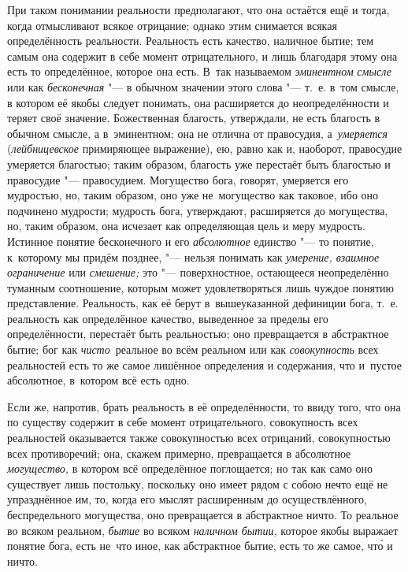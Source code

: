 \label{bkm:bm73b}При таком понимании реальности предполагают, что она
остаётся ещё и тогда, когда отмысливают всякое отрицание; однако этим снимается
всякая определённость реальности. Реальность есть качество, наличное бытие; тем
самым она содержит в себе момент отрицательного, и лишь благодаря этому она
есть то определённое, которое она есть. В~так называемом
{\em эминентном} {\em смысле} или как {\em бесконечная} "--- в обычном значении
этого слова "--- т.~е. в~том смысле, в котором её якобы следует понимать, она
расширяется до неопределённости и теряет своё значение. Божественная благость,
утверждали, не есть благость в обычном смысле, а в~эминентном; она не отлична
от правосудия, а~{\em умеряется} ({\em лейбницевское} примиряющее выражение),
ею, равно как и, наоборот, правосудие умеряется благостью; таким образом,
благость уже перестаёт быть благостью и правосудие "--- правосудием. Могущество
бога, говорят, умеряется его мудростью, но, таким образом, оно уже
не~могущество как таковое, ибо оно подчинено мудрости; мудрость бога,
утверждают, расширяется до могущества, но, таким образом, она исчезает как
определяющая цель и меру мудрость. Истинное понятие бесконечного и его
{\em абсолютное} единство "--- то понятие, к~которому мы придём позднее, "---
нельзя понимать как {\em умерение, взаимное ограничение} или {\em смешение;}
это "--- поверхностное, остающееся неопределённо туманным соотношение, которым
может удовлетворяться лишь чуждое понятию представление. Реальность, как её
берут в~вышеуказанной дефиниции бога, т.~е. реальность как определённое
качество, выведенное за пределы его определённости, перестаёт быть реальностью;
оно превращается в абстрактное бытие; бог как {\em чисто}~реальное во всём
реальном или как {\em совокупность} всех реальностей есть то же самое лишённое
определения и содержания, что и~пустое абсолютное, в~котором всё есть одно.

Если же, напротив, брать реальность в её определённости, то ввиду того, что
она по существу содержит в себе момент отрицательного, совокупность всех
реальностей оказывается также совокупностью всех отрицаний, совокупностью всех
противоречий; она, скажем примерно, превращается в абсолютное {\em могущество,}
в котором всё определённое поглощается; но так как само оно существует лишь
постольку, поскольку оно имеет рядом с собою нечто ещё не упразднённое им, то,
когда его мыслят расширенным до осуществлённого, беспредельного могущества, оно
превращается в абстрактное ничто. То реальное во всяком реальном, {\em бытие}
во всяком {\em наличном бытии,} которое якобы выражает понятие бога, есть
не~что иное, как абстрактное бытие, есть то же самое, чт\'{о} и ничто.

